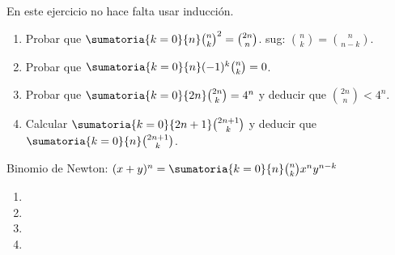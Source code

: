 \begin{enunciado}{\ejercicio}
  En este ejercicio no hace falta usar inducción.
  \begin{enumerate}[label=\roman*)]
    \item Probar que $\sumatoria{k = 0}{n} \binom{n}{k}^2 = \binom{2n}{n}$. \qquad sug: $\binom{n}{k} = \binom{n}{n-k}$.
    \item Probar que $\sumatoria{k = 0}{n} (-1)^k \binom{n}{k} = 0$.
    \item Probar que $\sumatoria{k = 0}{2n} \binom{2n}{k} = 4^n$ y deducir que $\binom{2n}{n} < 4^n$.
    \item Calcular $\sumatoria{k = 0}{2n+1} \binom{2n+1}{k}$ y deducir que $\sumatoria{k=0}{n} \binom{2n+1}{k}$.
  \end{enumerate}
\end{enunciado}

Binomio de Newton: $(x + y)^n = \sumatoria{k=0}{n} \binom{n}{k} x^n y^{n-k}$

\begin{enumerate}[label=\roman*)]
  \item
        \hacer
  \item
        \hacer
  \item
        \hacer
  \item
        \hacer
\end{enumerate}


